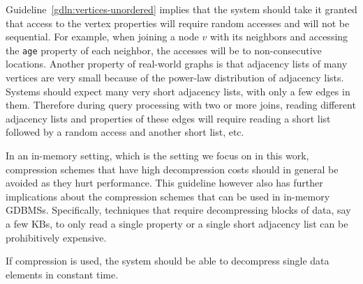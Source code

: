 \begin{guideline}  Guideline~\ref{gdln:vertices-unordered} implies that the system should take it granted that access to the vertex properties will require random accesses and will not be sequential. For example, when joining a node $v$ with its neighbors and accessing the \texttt{age} property of each neighbor, the accesses will be to non-consecutive locations. Another property of real-world graphs is that adjacency lists of many vertices are very small because of the power-law distribution of adjacency lists. Systems should expect many very short adjacency lists, with only a few edges in them. Therefore during query processing with two or more joins, reading different adjacency lists and properties of these edges will require reading a short list followed by a random access and another short list, etc.

In an in-memory setting, which is the setting we focus on in this work, compression schemes that have high decompression costs should in general be avoided as they hurt performance. This guideline however also has further implications about the compression schemes that can be used in in-memory GDBMSs. Specifically, techniques that require decompressing blocks of data, say a few KBs, to only read a single property or a single short adjacency list can be prohibitively expensive.

\begin{desideratum}
If compression is used, the system should be able to decompress single data elements in constant time.
\end{desideratum}  

\end{guideline}

